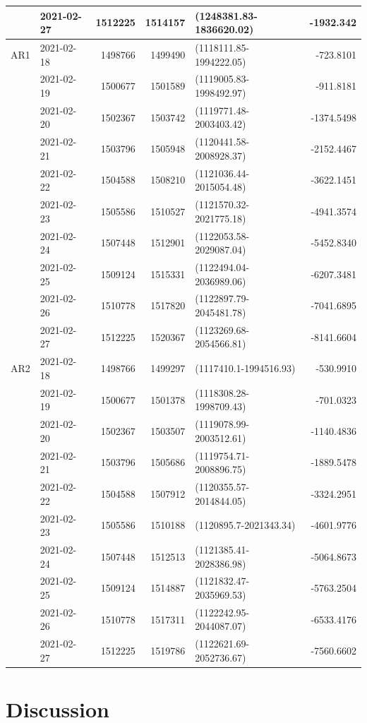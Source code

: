 \documentclass[10pt,letterpaper]{article}
\begin{document}
\begin{table}[!h]
\begin{tabular}[t]{l|l|r|r|l|r}
&2021-02-27 & 1512225 & 1514157 & (1248381.83-1836620.02) & -1932.342\\
\hline
AR1&2021-02-18 & 1498766 & 1499490 & (1118111.85-1994222.05) & -723.8101\\
&2021-02-19 & 1500677 & 1501589 & (1119005.83-1998492.97) & -911.8181\\
&2021-02-20 & 1502367 & 1503742 & (1119771.48-2003403.42) & -1374.5498\\
&2021-02-21 & 1503796 & 1505948 & (1120441.58-2008928.37) & -2152.4467\\
&2021-02-22 & 1504588 & 1508210 & (1121036.44-2015054.48) & -3622.1451\\
&2021-02-23 & 1505586 & 1510527 & (1121570.32-2021775.18) & -4941.3574\\
&2021-02-24 & 1507448 & 1512901 & (1122053.58-2029087.04) & -5452.8340\\
&2021-02-25 & 1509124 & 1515331 & (1122494.04-2036989.06) & -6207.3481\\
&2021-02-26 & 1510778 & 1517820 & (1122897.79-2045481.78) & -7041.6895\\
&2021-02-27 & 1512225 & 1520367 & (1123269.68-2054566.81) & -8141.6604\\
\hline
AR2&2021-02-18 & 1498766 & 1499297 & (1117410.1-1994516.93) & -530.9910\\
&2021-02-19 & 1500677 & 1501378 & (1118308.28-1998709.43) & -701.0323\\
&2021-02-20 & 1502367 & 1503507 & (1119078.99-2003512.61) & -1140.4836\\
&2021-02-21 & 1503796 & 1505686 & (1119754.71-2008896.75) & -1889.5478\\
&2021-02-22 & 1504588 & 1507912 & (1120355.57-2014844.05) & -3324.2951\\
&2021-02-23 & 1505586 & 1510188 & (1120895.7-2021343.34) & -4601.9776\\
&2021-02-24 & 1507448 & 1512513 & (1121385.41-2028386.98) & -5064.8673\\
&2021-02-25 & 1509124 & 1514887 & (1121832.47-2035969.53) & -5763.2504\\
&2021-02-26 & 1510778 & 1517311 & (1122242.95-2044087.07) & -6533.4176\\
&2021-02-27 & 1512225 & 1519786 & (1122621.69-2052736.67) & -7560.6602\\
\hline
\end{tabular}
\end{table}

\newpage
\hypertarget{results}{%
\section{Discussion}\label{Discussion}}
\end{document}
